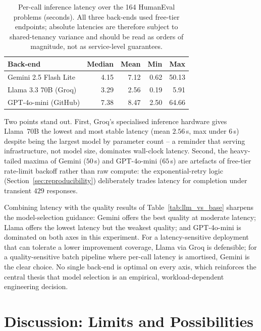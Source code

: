 \documentclass[conference]{IEEEtran}
\begin{document}
\begin{table}[htbp]
\caption{Per-call inference latency over the 164 HumanEval problems (seconds). All three back-ends used free-tier endpoints; absolute latencies are therefore subject to shared-tenancy variance and should be read as orders of magnitude, not as service-level guarantees.}
\label{tab:latency}
\centering
\footnotesize
\begin{tabular}{lrrrr}
\hline
\textbf{Back-end} & \textbf{Median} & \textbf{Mean} & \textbf{Min} & \textbf{Max} \\
\hline
Gemini 2.5 Flash Lite & 4.15 & 7.12 & 0.62 & 50.13 \\
Llama 3.3 70B (Groq) & 3.29 & 2.56 & 0.19 & 5.91 \\
GPT-4o-mini (GitHub) & 7.38 & 8.47 & 2.50 & 64.66 \\
\hline
\end{tabular}
\end{table}

Two points stand out. First, Groq's specialised inference hardware gives Llama~70B the lowest and most stable latency (mean $2.56$\,s, max under $6$\,s) despite being the largest model by parameter count -- a reminder that serving infrastructure, not model size, dominates wall-clock latency. Second, the heavy-tailed maxima of Gemini ($50$\,s) and GPT-4o-mini ($65$\,s) are artefacts of free-tier rate-limit backoff rather than raw compute: the exponential-retry logic (Section~\ref{sec:reproducibility}) deliberately trades latency for completion under transient $429$ responses.

Combining latency with the quality results of Table~\ref{tab:llm_vs_base} sharpens the model-selection guidance: Gemini offers the best quality at moderate latency; Llama offers the lowest latency but the weakest quality; and GPT-4o-mini is dominated on both axes in this experiment. For a latency-sensitive deployment that can tolerate a lower improvement coverage, Llama via Groq is defensible; for a quality-sensitive batch pipeline where per-call latency is amortised, Gemini is the clear choice. No single back-end is optimal on every axis, which reinforces the central thesis that model selection is an empirical, workload-dependent engineering decision.

\section{Discussion: Limits and Possibilities}
\label{sec:discussao}
\end{document}
